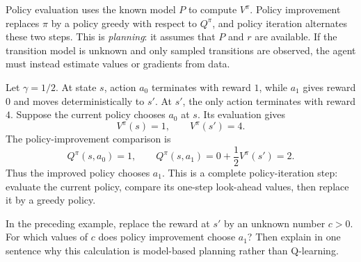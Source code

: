 \documentclass[11pt,a4paper]{article}
\theoremstyle{definition}
\begin{document}
\begin{note}
Policy evaluation uses the known model $P$ to compute $V^\pi$. Policy improvement replaces
$\pi$ by a policy greedy with respect to $Q^\pi$, and policy iteration alternates these two
steps. This is \emph{planning}: it assumes that $P$ and $r$ are available. If the transition
model is unknown and only sampled transitions are observed, the agent must instead estimate
values or gradients from data.
\end{note}

\begin{example}
Let $\gamma=1/2$. At state $s$, action $a_0$ terminates with reward $1$, while $a_1$
gives reward $0$ and moves deterministically to $s'$. At $s'$, the only action terminates
with reward $4$. Suppose the current policy chooses $a_0$ at $s$. Its evaluation gives
\[
V^\pi(s)=1,
\qquad
V^\pi(s')=4.
\]
The policy-improvement comparison is
\[
Q^\pi(s,a_0)=1,
\qquad
Q^\pi(s,a_1)=0+\frac12V^\pi(s')=2.
\]
Thus the improved policy chooses $a_1$. This is a complete policy-iteration step: evaluate
the current policy, compare its one-step look-ahead values, then replace it by a greedy
policy.
\end{example}

\begin{exercise}
In the preceding example, replace the reward at $s'$ by an unknown number $c>0$. For
which values of $c$ does policy improvement choose $a_1$? Then explain in one sentence why
this calculation is model-based planning rather than Q-learning.
\end{exercise}
\end{document}
